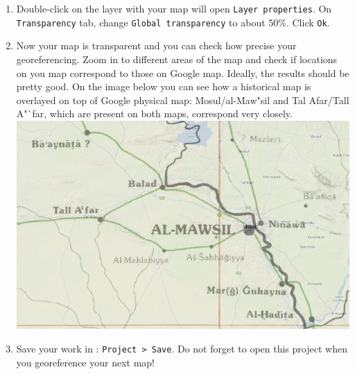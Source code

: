 \documentclass[12pt,oneside]{article}
\begin{document}
\begin{enumerate}
\item Double-click on the layer with your map will open \texttt{Layer properties}. On \texttt{Transparency} tab, change \texttt{Global transparency} to about 50\%. Click \texttt{Ok}.

\item Now your map is transparent and you can check how precise your georeferencing. Zoom in to different areas of the map and check if locations on you map correspond to those on Google map. Ideally, the results should be pretty good. On the image below you can see how a historical map is overlayed on top of Google physical map: Mosul/al-Maw"sil and Tal Afar/Tall A"`far, which are present on both maps, correspond very closely.\\
\includegraphics[scale=.5]{qgis_georeferencedmap}

\item Save your work in \QGIS: \texttt{Project > Save}. Do not forget to open this project when you georeference your next map!


\end{enumerate}
\end{document}
